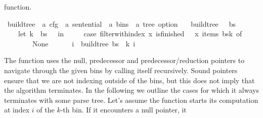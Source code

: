 \begin{isabellebody}
\begin{isamarkuptext}
 function.%
\end{isamarkuptext}\isamarkuptrue%
\isamarkupfalse%
\ build{\isacharunderscore}{\kern0pt}tree\ {\isacharcolon}{\kern0pt}{\isacharcolon}{\kern0pt}\ {\isachardoublequoteopen}{\isacharprime}{\kern0pt}a\ cfg\ {\isasymRightarrow}\ {\isacharprime}{\kern0pt}a\ sentential\ {\isasymRightarrow}\ {\isacharprime}{\kern0pt}a\ bins\ {\isasymRightarrow}\ {\isacharprime}{\kern0pt}a\ tree\ option{\isachardoublequoteclose}\ \isanewline
\ \ {\isachardoublequoteopen}build{\isacharunderscore}{\kern0pt}tree\ {\isasymG}\ {\isasymomega}\ bs\ {\isasymequiv}\isanewline
\ \ \ \ let\ k\ {\isacharequal}{\kern0pt}\ {\isacharbar}{\kern0pt}bs{\isacharbar}{\kern0pt}\ {\isacharminus}{\kern0pt}\ {}\ in\ {\isacharparenleft}{\kern0pt}\isanewline
\ \ \ \ case\ filter{\isacharunderscore}{\kern0pt}with{\isacharunderscore}{\kern0pt}index\ {\isacharparenleft}{\kern0pt}{\isasymlambda}x{\isachardot}{\kern0pt}\ is{\isacharunderscore}{\kern0pt}finished\ {\isasymG}\ {\isasymomega}\ x{\isacharparenright}{\kern0pt}\ {\isacharparenleft}{\kern0pt}items\ {\isacharparenleft}{\kern0pt}bs{\isacharbang}{\kern0pt}k{\isacharparenright}{\kern0pt}{\isacharparenright}{\kern0pt}\ of\isanewline
\ \ \ \ \ \ {\isacharbrackleft}{\kern0pt}{\isacharbrackright}{\kern0pt}\ {\isasymRightarrow}\ None\isanewline
\ \ \ \ {\isacharbar}{\kern0pt}\ {\isacharparenleft}{\kern0pt}{\isacharunderscore}{\kern0pt}{\isacharcomma}{\kern0pt}\ i{\isacharparenright}{\kern0pt}{\isacharhash}{\kern0pt}{\isacharunderscore}{\kern0pt}\ {\isasymRightarrow}\ build{\isacharunderscore}{\kern0pt}tree{\isacharprime}{\kern0pt}\ bs\ {\isasymomega}\ k\ i{\isacharparenright}{\kern0pt}{\isachardoublequoteclose}%
\isadelimdocument
%
\endisadelimdocument
%
\isatagdocument
%
\isamarkuptrue%
%
\endisatagdocument
{\isafolddocument}%
%
\isadelimdocument
%
\endisadelimdocument
%
\begin{isamarkuptext}%
The function  uses the null, predecessor and predecessor/reduction pointers to
navigate through the given bins by calling itself recursively. Sound pointers ensure that we are not
indexing outside of the bins, but this does not imply that the algorithm terminates. In the following
we outline the cases for which it always terminates with some parse tree. Let's assume the
function starts its computation at index $i$ of the $k$-th bin. If it encounters a null pointer, it

\end{isamarkuptext}
\end{isabellebody}
